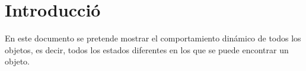 \section{Introducció}\label{sec:intro}

\begin{flushleft}
En este documento se pretende mostrar el comportamiento dinámico de todos los objetos, es decir, todos los estados diferentes en los que se puede encontrar un objeto.
\end{flushleft}
